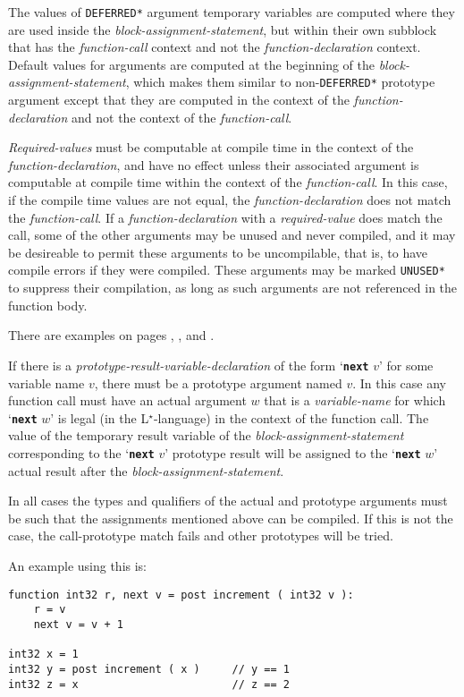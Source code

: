 \documentclass[12pt]{article}
\newcommand{\LSTAR}{L$^\star$}
\newcommand{\TT}[1]{{\tt \bfseries #1}}
\newenvironment{indpar}[1][0.3in]%
	{\begin{list}{}%
		     {\setlength{\itemsep}{0in}%
		      \setlength{\topsep}{0in}%
		      \setlength{\parsep}{1ex}%
		      \setlength{\labelwidth}{#1}%
		      \setlength{\leftmargin}{#1}%
		      \addtolength{\leftmargin}{\labelsep}}%
	 \item}%
	{\end{list}}
\begin{document}
The values of {\tt *DEFERRED*}
argument temporary variables are computed where they are used
inside the {\em block-assignment-statement},
but within their own subblock that has the
{\em function-call} context and not the {\em function-declaration}
context.
Default values for arguments are computed at the beginning
of the {\em block-assignment-statement}, which makes them similar to
non-{\tt *DEFERRED*} prototype argument except that they are computed
in the context of the {\em function-declaration} and not the context
of the {\em function-call}.

{\em Required-values} must be computable at compile time in the
context of the {\em function-declaration}, and have no effect unless
their associated argument is computable at compile time within the
context of the {\em function-call}.
In this case, if the compile time values are not equal, the
{\em function-declaration} does not match the {\em function-call}.
If a {\em function-declaration}
with a {\em required-value} does match the call,
some of the other arguments may be unused and never compiled,
and it may be desireable to permit these arguments to be uncompilable,
that is, to have compile errors if they were compiled.  These
arguments may be marked {\tt *UNUSED*} to suppress their compilation,
as long as such arguments are
not referenced in the function body.

There are examples on pages \pageref{AND-EXAMPLE}, \pageref{IF-ELSE-EXAMPLE},
and \pageref{COMPARE-EXAMPLE}.

If there is a {\em prototype-result-variable-declaration}
of the form `\TT{next} $v$' for some variable name $v$, there must
be a prototype
argument named $v$.
In this case any function call must have an actual argument $w$ that
is a {\em variable-name} for which `\TT{next} $w$' is legal
(in the \LSTAR-language) in the context
of the function call.  The value of the temporary result variable of the
{\em block-assignment-statement} corresponding to the `\TT{next} $v$'
prototype result will be assigned to the `\TT{next} $w$' actual result
after the {\em block-assignment-statement}.

In all cases the types and qualifiers of the actual and prototype
arguments must be such that the assignments mentioned above can
be compiled.  If this is not the case, the call-prototype match
fails and other prototypes will be tried.

An example using this is:
\begin{indpar}\begin{verbatim}
function int32 r, next v = post increment ( int32 v ):
    r = v
    next v = v + 1

int32 x = 1
int32 y = post increment ( x )     // y == 1
int32 z = x                        // z == 2
\end{verbatim}\end{indpar}
\end{document}

